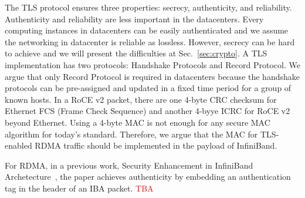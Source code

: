 The TLS protocol ensures three properties: secrecy, authenticity, and reliability. Authenticity and reliability are less important in the datacenters. Every computing instances in datacenters can be easily authenticated and we assume the networking in datacenter is reliable as lossless. However, secrecy can be hard to achieve and we will present the difficulties at Sec.~\ref{sec:crypto}. A TLS implementation has two protocols: Handshake Protocols and Record Protocol. We argue that only Record Protocol is required in datacenters because the handshake protocols can be pre-assigned and updated in a fixed time period for a group of known hosts. In a RoCE v2 packet, there are one 4-byte CRC checksum for Ethernet FCS (Frame Check Sequence) and another 4-byye ICRC for RoCE v2 beyond Ethernet. Using a 4-byte MAC is not enough for any secure MAC algorithm for today's standard. Therefore, we argue that the MAC for TLS-enabled RDMA traffic should be implemented in the payload of InfiniBand.

For RDMA, in a previous work, Security Enhancement in InfiniBand Archetecture~\cite{Lee:2005:SEI:1053727.1054449}, the paper achieves authenticity by embedding an authentication tag in the
header of an IBA packet. \textcolor{red}{TBA}
